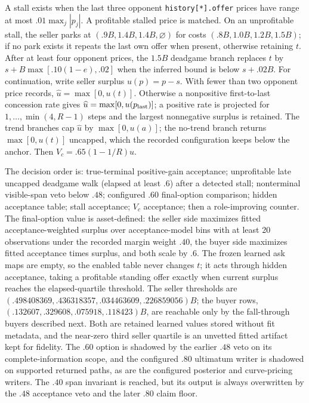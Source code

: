 A stall exists when the last three opponent \texttt{history[*].offer} prices
have range at most $.01\max_j|p_j|$. A profitable stalled price is matched. On
an unprofitable stall, the seller parks at
$(.9B,1.4B,1.4B,\varnothing)$ for costs $(.8B,1.0B,1.2B,1.5B)$; if no park
exists it repeats the last own offer when present, otherwise retaining $t$.
After at least four opponent prices, the
$1.5B$ deadgame branch replaces $t$ by
$s+B\max[.10(1-e),.02]$ when the inferred bound is below $s+.02B$.
For continuation, write seller surplus $u(p)=p-s$. With fewer than two opponent
price records, $\widehat u=\max[0,u(t)]$. Otherwise a nonpositive first-to-last
concession rate gives $\widehat u=\max[0,u(p_{\rm last})]$; a positive rate is
projected for $1,\ldots,\min(4,R-1)$ steps and the largest nonnegative surplus
is retained. The trend branches cap $\widehat u$ by $\max[0,u(a)]$; the no-trend branch
returns $\max[0,u(t)]$ uncapped, which the recorded configuration keeps below
the anchor. Then $V_c=.65(1-1/R)\widehat u$.

The decision order is: true-terminal positive-gain acceptance; unprofitable
late uncapped deadgame walk (elapsed at least $.6$) after a detected stall;
nonterminal visible-span veto below $.48$; configured $.60$ final-option
comparison; hidden acceptance table; stall acceptance; $V_c$ acceptance; then
a role-improving counter. The final-option value is asset-defined: the seller
side maximizes fitted acceptance-weighted surplus over acceptance-model bins
with at least 20 observations under the recorded margin weight $.40$, the
buyer side maximizes fitted acceptance times surplus, and both scale by $.6$.
The frozen learned ask maps are empty, so the enabled table never changes
$t$; it acts through hidden acceptance, taking a profitable standing offer
exactly when current surplus reaches the elapsed-quartile threshold. The
seller thresholds are $(.498408369,.436318357,.034463609,.226859056)B$; the
buyer rows, $(.132607,.329608,.075918,.118423)B$, are reachable only by the
fall-through buyers described next. Both are retained learned values stored
without fit metadata, and the near-zero third seller quartile is an unvetted
fitted artifact kept for fidelity. The $.60$ option is shadowed by the earlier
$.48$ veto on its complete-information scope, and the configured $.80$
ultimatum writer is shadowed on supported returned paths, as are the
configured posterior and curve-pricing writers. The $.40$ span invariant is
reached, but its output is always overwritten by the $.48$ acceptance veto
and the later $.80$ claim floor.

